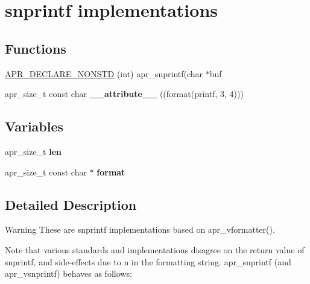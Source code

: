 \hypertarget{group___a_p_r___strings___snprintf}{}\section{snprintf implementations}
\label{group___a_p_r___strings___snprintf}
\subsection*{Functions}
\begin{DoxyCompactItemize}
\item 
\mbox{\hyperlink{group___a_p_r___strings___snprintf_ga0dc3cc1193c72c91053f32d5ed97f88d}{A\+P\+R\+\_\+\+D\+E\+C\+L\+A\+R\+E\+\_\+\+N\+O\+N\+S\+TD}} (int) apr\+\_\+snprintf(char $\ast$buf
\item 
\mbox{\label{group___a_p_r___strings___snprintf_ga767f277ea2c91fc4ab29752439d44ece}} 
apr\+\_\+size\+\_\+t const char {\bfseries \+\_\+\+\_\+attribute\+\_\+\+\_\+} ((format(printf, 3, 4)))
\end{DoxyCompactItemize}
\subsection*{Variables}
\begin{DoxyCompactItemize}
\item 
\mbox{\label{group___a_p_r___strings___snprintf_ga7aaae9d6ec4ff865ec20a5ca802dc3af}} 
apr\+\_\+size\+\_\+t {\bfseries len}
\item 
\mbox{\label{group___a_p_r___strings___snprintf_gafa8d2f476d8295cbd359245828f5d041}} 
apr\+\_\+size\+\_\+t const char $\ast$ {\bfseries format}
\end{DoxyCompactItemize}


\subsection{Detailed Description}
\begin{DoxyWarning}{Warning}
These are snprintf implementations based on apr\+\_\+vformatter().
\end{DoxyWarning}
Note that various standards and implementations disagree on the return value of snprintf, and side-\/effects due to n in the formatting string. apr\+\_\+snprintf (and apr\+\_\+vsnprintf) behaves as follows\+:

